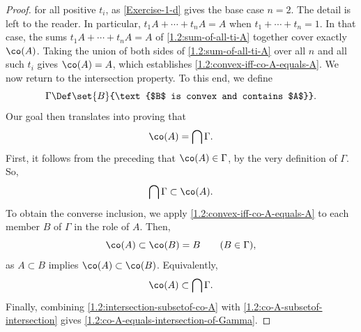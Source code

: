 \begin{proof}
% 
for all positive $t_i$, as \eqref{Exercise-1-d} gives the base case $n = 2$. The detail is left to the reader. In particular, %
$t_1 A + \cdots + t_n A = A$ when $t_1 + \cdots + t_n = 1$. In that case, the sums $t_1 A + \cdots + t_n A = A$ of %
\eqref{1.2:sum-of-all-ti-A} together cover exactly $\co(A)$. Taking the union of both sides of \eqref{1.2:sum-of-all-ti-A} %
over all $n$ and all such $t_i$ gives $\co(A) = A$, which establishes \eqref{1.2:convex-iff-co-A-equals-A}. We now return to %
the intersection property. To this end, we define %
% 
\begin{equation} 
  \Gamma \Def \set{B}{\text{$B$ is convex and contains $A$}}.
\end{equation} 
% 
Our goal then translates into proving that 
% 
\begin{equation}\label{1.2:co-A-equals-intersection-of-Gamma}
  \co(A) = \bigcap \Gamma.
\end{equation} 
% 
First, it follows from the preceding that $\co(A) \in \Gamma$, by the very definition of $\Gamma$. So, 
% 
\begin{equation}\label{1.2:intersection-subsetof-co-A}
  \bigcap \Gamma \subset \co(A). 
\end{equation}
% 
To obtain the converse inclusion, we apply \eqref{1.2:convex-iff-co-A-equals-A} to each member $B$ of $\Gamma$ in the role of %
$A$. Then, %
% 
\begin{equation}
  \co(A) \subset \co(B) = B \qquad(B \in \Gamma), 
\end{equation}
% 
as $A \subset B$ implies $\co(A) \subset \co(B)$. Equivalently, 
% 
\begin{equation}\label{1.2:co-A-subsetof-intersection}
  \co(A) \subset \bigcap \Gamma.
\end{equation}
%
Finally, combining \eqref{1.2:intersection-subsetof-co-A} with \eqref{1.2:co-A-subsetof-intersection} gives %
\eqref{1.2:co-A-equals-intersection-of-Gamma}.
\end{proof}
% 
